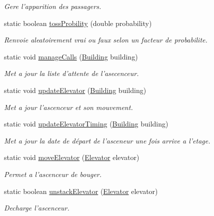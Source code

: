 \begin{DoxyCompactItemize}
\begin{DoxyCompactList}\small\item\em Gere l'apparition des passagers. \end{DoxyCompactList}\item 
static boolean \hyperlink{classElevatorProject_a5ec35e7e25ad0689872b3e1801881363}{toss\-Probility} (double probability)
\begin{DoxyCompactList}\small\item\em Renvoie aleatoirement vrai ou faux selon un facteur de probabilite. \end{DoxyCompactList}\item 
static void \hyperlink{classElevatorProject_a47e8310e972ae9a6f5b97e61af75b733}{manage\-Calls} (\hyperlink{classElevatorProject_1_1Building}{Building} building)
\begin{DoxyCompactList}\small\item\em Met a jour la liste d'attente de l'asecenceur. \end{DoxyCompactList}\item 
static void \hyperlink{classElevatorProject_a728434fe5435fc78b48a67bd14cafd41}{update\-Elevator} (\hyperlink{classElevatorProject_1_1Building}{Building} building)
\begin{DoxyCompactList}\small\item\em Met a jour l'ascenceur et son mouvement. \end{DoxyCompactList}\item 
static void \hyperlink{classElevatorProject_ab5a957a536f530da15ccd513441a5dce}{update\-Elevator\-Timing} (\hyperlink{classElevatorProject_1_1Building}{Building} building)
\begin{DoxyCompactList}\small\item\em Met a jour la date de départ de l'asceneur une fois arrive a l'etage. \end{DoxyCompactList}\item 
static void \hyperlink{classElevatorProject_a5db832b5592e8a9229dc15abdd4430aa}{move\-Elevator} (\hyperlink{classElevatorProject_1_1Elevator}{Elevator} elevator)
\begin{DoxyCompactList}\small\item\em Permet a l'ascenceur de bouger. \end{DoxyCompactList}\item 
static boolean \hyperlink{classElevatorProject_a1f44c119fd987a5fac357244fbfe93bc}{unstack\-Elevator} (\hyperlink{classElevatorProject_1_1Elevator}{Elevator} elevator)
\begin{DoxyCompactList}\small\item\em Decharge l'ascenceur. \end{DoxyCompactList}\item 

\end{DoxyCompactItemize}

